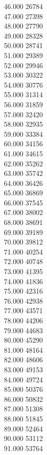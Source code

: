 { 46.000	26784 \\
 47.000	27398 \\
 48.000	27790 \\
 49.000	28328 \\
 50.000	28741 \\
 51.000	29389 \\
 52.000	29946 \\
 53.000	30322 \\
 54.000	30776 \\
 55.000	31314 \\
 56.000	31859 \\
 57.000	32420 \\
 58.000	32935 \\
 59.000	33384 \\
 60.000	34156 \\
 61.000	34615 \\
 62.000	35262 \\
 63.000	35742 \\
 64.000	36426 \\
 65.000	36869 \\
 66.000	37545 \\
 67.000	38002 \\
 68.000	38691 \\
 69.000	39189 \\
 70.000	39812 \\
 71.000	40254 \\
 72.000	40748 \\
 73.000	41395 \\
 74.000	41836 \\
 75.000	42316 \\
 76.000	42938 \\
 77.000	43571 \\
 78.000	44206 \\
 79.000	44683 \\
 80.000	45290 \\
 81.000	48164 \\
 82.000	48606 \\
 83.000	49153 \\
 84.000	49724 \\
 85.000	50376 \\
 86.000	50832 \\
 87.000	51308 \\
 88.000	51845 \\
 89.000	52464 \\
 90.000	53112 \\
 91.000	53764 \\
}
